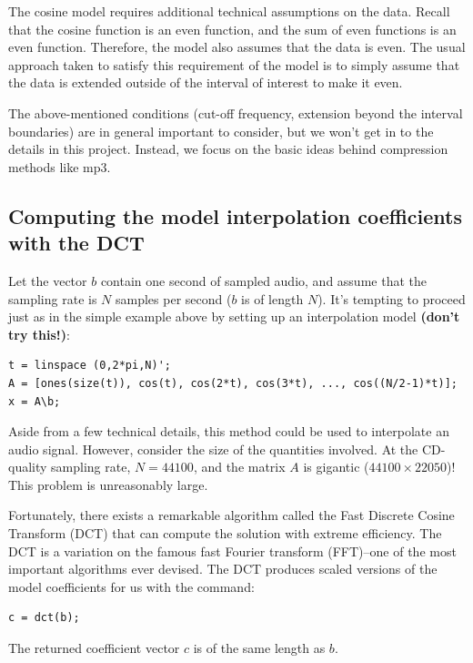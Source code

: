 \documentclass[10pt]{article}
\begin{document}
The cosine model requires additional technical assumptions on the data.  Recall
that the cosine function is an even function, and the sum of even functions is
an even function. Therefore, the model also assumes that the data is even. The
usual approach taken to satisfy this requirement of the model is to simply
assume that the data is extended outside of the interval of interest to make it
even.

The above-mentioned conditions (cut-off frequency, extension beyond the
interval boundaries) are in general important to consider, but we won't get in
to the details in this project.  Instead, we focus on the basic ideas behind
compression methods like mp3. 

\subsection*{Computing the model interpolation coefficients with the DCT}

Let the vector $b$ contain one second of sampled audio, and assume that the
sampling rate is $N$ samples per second ($b$ is of length $N$).  It's tempting
to proceed just as in the simple example above by setting up an interpolation
model  {\bf (don't try this!)}:
\begin{verbatim}
t = linspace (0,2*pi,N)';
A = [ones(size(t)), cos(t), cos(2*t), cos(3*t), ..., cos((N/2-1)*t)];
x = A\b;
\end{verbatim}
Aside from a few technical details, this method could be used to interpolate
an audio signal. However, consider the size of the quantities involved.
At the CD-quality sampling rate, $N=44100$, and the matrix $A$ is
gigantic ($44100\times 22050$)!  This problem is unreasonably large.


Fortunately, there exists a remarkable algorithm called the Fast Discrete
Cosine Transform (DCT) that can compute the solution with extreme efficiency.
The DCT is a variation on the famous fast Fourier transform (FFT)--one of the
most important algorithms ever devised. The DCT produces scaled versions of the
model coefficients for us with the command:
\begin{verbatim}
c = dct(b);
\end{verbatim}
The returned coefficient vector $c$ is of the same length as $b$. 
\end{document}
